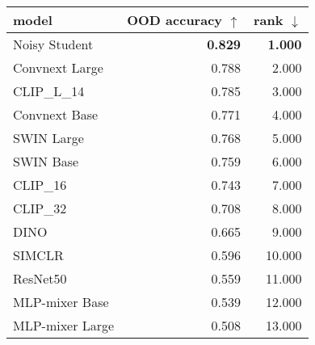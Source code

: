 \begin{tabular}{lrr}
\toprule
          model & OOD accuracy $\uparrow$ & rank $\downarrow$ \\
\midrule
  Noisy Student &          \textbf{0.829} &    \textbf{1.000} \\
 Convnext Large &                   0.788 &             2.000 \\
    CLIP\_L\_14 &                   0.785 &             3.000 \\
  Convnext Base &                   0.771 &             4.000 \\
     SWIN Large &                   0.768 &             5.000 \\
      SWIN Base &                   0.759 &             6.000 \\
       CLIP\_16 &                   0.743 &             7.000 \\
       CLIP\_32 &                   0.708 &             8.000 \\
           DINO &                   0.665 &             9.000 \\
         SIMCLR &                   0.596 &            10.000 \\
       ResNet50 &                   0.559 &            11.000 \\
 MLP-mixer Base &                   0.539 &            12.000 \\
MLP-mixer Large &                   0.508 &            13.000 \\
\bottomrule
\end{tabular}

